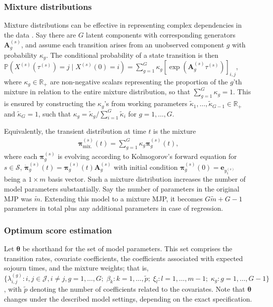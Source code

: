 \subsubsection{Mixture distributions} \label{sec:mixture}
Mixture distributions can be effective in representing complex dependencies in the data \citep{frydman2024,Bisgaard2026}.
Say there are $G$ latent components with corresponding generators $\bm A_g^{(s)}$, and assume each transition arises from an unobserved component $g$ with probability $\kappa_g$.
The conditional probability of a state transition is then
$
\mathbb P\left( X^{(s)}(\tau^{(s)}) = j \mid X^{(s)}(0) = i \right) = \sum_{g = 1}^G \kappa_g \left[ \exp( \bm A_g^{(s)} \tau^{(s)}) \right]_{i,j}
$, where $\kappa_g \in \mathbb R_+$ are non-negative scalars representing the proportion of the $g$'th mixture in relation to the entire mixture distribution, so that $ \sum_{g = 1}^G \kappa_g = 1$. This is ensured by constructing the $\kappa_g$'s from working parameters $\tilde\kappa_1,\dots,\tilde\kappa_{G-1}\in\mathbb R_+$ and $\tilde\kappa_G = 1$, such that $\kappa_g = \widetilde{\kappa}_g / \sum_{i=1}^G \widetilde{\kappa}_i$ for $g = 1, \dots, G$.

Equivalently, the transient distribution at time $t$ is the mixture
\begin{align}
\bm\pi_{\text{mix.}}^{(s)}(t) = \sum_{g = 1}^G \kappa_g \bm\pi_g^{(s)}(t), \label{eq:mixture}
\end{align}
where each $\bm\pi_g^{(s)}$ is evolving according to Kolmogorov's forward equation for $s \in \mathcal S$, $\Dot{\bm{\pi}}_g^{(s)}(t) = \bm{\pi}_g^{(s)}(t) \bm{A}^{(s)}_g$ with initial condition $\bm \pi_g^{(s)}(0) = \bm e_{y_1^{(s)}}$ being a $1\times m$ basis vector.
Such a mixture distribution increases the number of model parameters substantially. Say the number of parameters in the original MJP was $\widetilde{m}$. Extending this model to a mixture MJP, it becomes $G \widetilde{m} + G-1$ parameters in total plus any additional parameters in case of regression. 




\subsubsection{Optimum score estimation}\label{sec:optimum_score_estimation}

Let $\bm{\theta}$ be shorthand for the set of model parameters. This set comprises the transition rates, covariate coefficients, the coefficients associated with expected sojourn times, and the mixture weights; that is, $\{ \lambda_{i,j}^{(g)} : i,j \in \mathcal{J}, i \neq j, g=1,\dots,G ; \; \beta_k : k = 1,\dots, \widetilde{p} ; \; \xi_l : l = 1, \dots, m-1 ;  \; \kappa_g : g=1,\dots,G-1\} $, with $\widetilde{p}$ denoting the number of coefficients related to the covariates. Note that $\bm{\theta}$ changes under the described model settings, depending on the exact specification.

